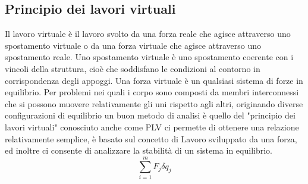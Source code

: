 \subsection{Principio dei lavori virtuali}
Il lavoro virtuale è il lavoro svolto da una forza reale che agisce attraverso uno spostamento virtuale o da una forza virtuale che agisce attraverso uno spostamento reale.
Uno spostamento virtuale è uno spostamento coerente con i vincoli della struttura, cioè che soddisfano le condizioni al contorno in corrispondenza degli appoggi.
Una forza virtuale è un qualsiasi sistema di forze in equilibrio.
Per problemi nei quali i corpo sono composti da membri interconnessi che si possono muovere relativamente gli uni rispetto agli altri, originando diverse configurazioni di equilibrio un buon metodo di analisi è quello del "principio dei lavori virtuali" conosciuto anche come PLV ci permette di ottenere una relazione relativamente semplice, è basato sul concetto di Lavoro sviluppato da una forza, ed inoltre ci consente di analizzare la stabilità di un sistema in equilibrio.
\begin{equation}
    \sum_{i=1}^m F_j\delta q_j\label{eq:din}
\end{equation}

